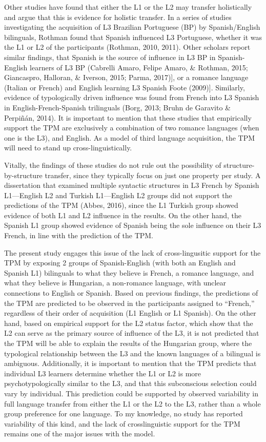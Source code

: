 \documentclass[
  english,
  man]{apa6}
\begin{document}
Other studies have found that either the L1 or the L2 may transfer holistically and argue that this is evidence for holistic transfer. In a series of studies investigating the acquisition of L3 Brazilian Portuguese (BP) by Spanish/English bilinguals, Rothman found that Spanish influenced L3 Portuguese, whether it was the L1 or L2 of the participants (Rothman, 2010, 2011). Other scholars report similar findings, that Spanish is the source of influence in L3 BP in Spanish-English learners of L3 BP (Cabrelli Amaro, Felipe Amaro, \& Rothman, 2015; Giancaspro, Halloran, \& Iverson, 2015; Parma, 2017){]}, or a romance language (Italian or French) and English learning L3 Spanish Foote (2009){]}.
Similarly, evidence of typologically driven influence was found from French into L3 Spanish in English-French-Spanish trilinguals (Borg, 2013; Bruhn de Garavito \& Perpiñán, 2014). It is important to mention that these studies that empirically support the TPM are exclusively a combination of two romance languages (when one is the L3), and English. As a model of third language acquisition, the TPM will need to stand up cross-linguistically.

Vitally, the findings of these studies do not rule out the possibility of structure-by-structure transfer, since they typically focus on just one property per study. A dissertation that examined multiple syntactic structures in L3 French by Spanish L1---English L2 and Turkish L1---English L2 groups did not support the predictions of the TPM (Abbes, 2016), since the L1 Turkish group showed evidence of both L1 and L2 influence in the results. On the other hand, the Spanish L1 group showed evidence of Spanish being the sole influence on their L3 French, in line with the prediction of the TPM.

The present study engages this issue of the lack of cross-lingusitic support for the TPM by exposing 2 groups of Spanish-English (with both an English and Spanish L1) bilinguals to what they believe is French, a romance language, and what they believe is Hungarian, a non-romance language, with unclear connections to English or Spanish. Based on previous findings, the predictions of the TPM are predicted to be observed in the participants assigned to ``French,'' regardless of their order of acquisition (L1 English or L1 Spanish).
On the other hand, based on empirical support for the L2 status factor, which show that the L2 can serve as the primary source of influence of the L3, it is not predicted that the TPM will be able to explain the results of the Hungarian group, where the typological relationship between the L3 and the known languages of a bilingual is ambiguous.
Additionally, it is important to mention that the TPM predicts that individual L3 learners determine whether the L1 or L2 is more psychotypologically similar to the L3, and that this subconscious selection could vary by individual.
This prediction could be supported by observed variability in full language transfer from either the L1 or the L2 to the L3, rather than a whole group preference for one language. To my knowledge, no study has reported variability of this kind, and the lack of crosslinguistic support for the TPM remains one of the major issues with the model.
\end{document}
